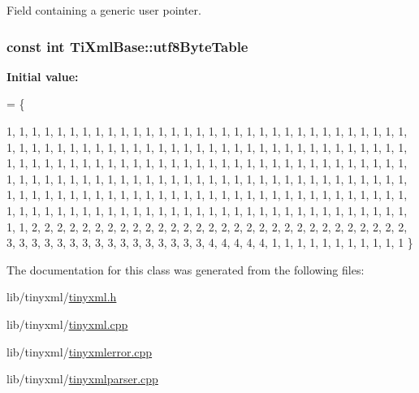 Field containing a generic user pointer. 

\hypertarget{class_ti_xml_base_ac8c86058137bdb4b413c3eca58f2d467}{
\subsubsection[{utf8\-Byte\-Table}]{\setlength{\rightskip}{0pt plus 5cm}const int Ti\-Xml\-Base\-::utf8\-Byte\-Table\hspace{0.3cm}{\ttfamily [static]}}}\label{class_ti_xml_base_ac8c86058137bdb4b413c3eca58f2d467}
{\bfseries Initial value\-:}
\begin{DoxyCode}
= 
\{
    
        1,  1,  1,  1,  1,  1,  1,  1,  1,  1,  1,  1,  1,  1,  1,  1,  
        1,  1,  1,  1,  1,  1,  1,  1,  1,  1,  1,  1,  1,  1,  1,  1,  
        1,  1,  1,  1,  1,  1,  1,  1,  1,  1,  1,  1,  1,  1,  1,  1,  
        1,  1,  1,  1,  1,  1,  1,  1,  1,  1,  1,  1,  1,  1,  1,  1,  
        1,  1,  1,  1,  1,  1,  1,  1,  1,  1,  1,  1,  1,  1,  1,  1,  
        1,  1,  1,  1,  1,  1,  1,  1,  1,  1,  1,  1,  1,  1,  1,  1,  
        1,  1,  1,  1,  1,  1,  1,  1,  1,  1,  1,  1,  1,  1,  1,  1,  
        1,  1,  1,  1,  1,  1,  1,  1,  1,  1,  1,  1,  1,  1,  1,  1,  
        1,  1,  1,  1,  1,  1,  1,  1,  1,  1,  1,  1,  1,  1,  1,  1,  
        1,  1,  1,  1,  1,  1,  1,  1,  1,  1,  1,  1,  1,  1,  1,  1,  
        1,  1,  1,  1,  1,  1,  1,  1,  1,  1,  1,  1,  1,  1,  1,  1,  
        1,  1,  1,  1,  1,  1,  1,  1,  1,  1,  1,  1,  1,  1,  1,  1,  
        1,  1,  2,  2,  2,  2,  2,  2,  2,  2,  2,  2,  2,  2,  2,  2,  
        2,  2,  2,  2,  2,  2,  2,  2,  2,  2,  2,  2,  2,  2,  2,  2,  
        3,  3,  3,  3,  3,  3,  3,  3,  3,  3,  3,  3,  3,  3,  3,  3,  
        4,  4,  4,  4,  4,  1,  1,  1,  1,  1,  1,  1,  1,  1,  1,  1   
\}
\end{DoxyCode}


The documentation for this class was generated from the following files\-:\begin{DoxyCompactItemize}
\item 
lib/tinyxml/\hyperlink{tinyxml_8h}{tinyxml.\-h}\item 
lib/tinyxml/\hyperlink{tinyxml_8cpp}{tinyxml.\-cpp}\item 
lib/tinyxml/\hyperlink{tinyxmlerror_8cpp}{tinyxmlerror.\-cpp}\item 
lib/tinyxml/\hyperlink{tinyxmlparser_8cpp}{tinyxmlparser.\-cpp}\end{DoxyCompactItemize}
